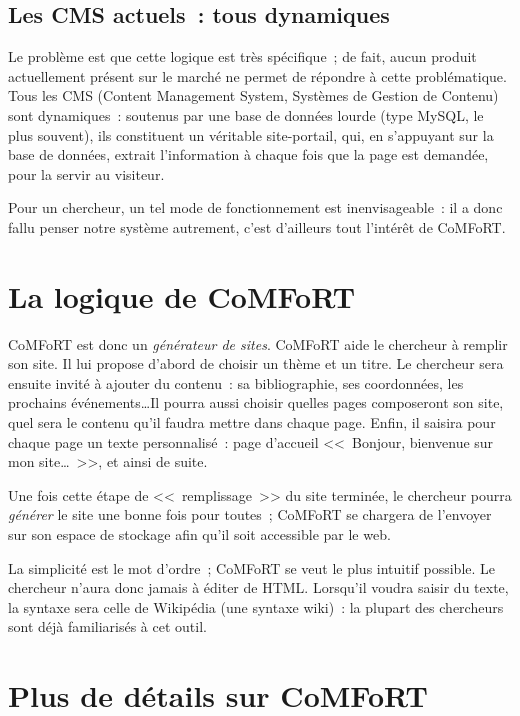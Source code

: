 \documentclass[final,11pt,a4paper,twoside,titlepage]{article}
\newcommand{\p}{\vspace{0.3em}}
\begin{document}
{    \subsection{Les CMS actuels~: tous dynamiques}
      Le problème est que cette logique est très spécifique~; de fait, aucun
      produit actuellement présent sur le marché ne permet de répondre à cette
      problématique.  Tous les CMS (Content Management System, Systèmes de
      Gestion de Contenu) sont dynamiques~: soutenus par une base de données
      lourde (type MySQL, le plus souvent), ils constituent un véritable
      site-portail, qui, en s'appuyant sur la base de données, extrait
      l'information à chaque fois que la page est demandée, pour la servir au
      visiteur.\p

      Pour un chercheur, un tel mode de fonctionnement est inenvisageable~: il a
      donc fallu penser notre système autrement, c'est d'ailleurs tout l'intérêt
      de CoMFoRT.

  \section{La logique de CoMFoRT}
    CoMFoRT est donc un \emph{générateur de sites}. CoMFoRT aide le
    chercheur à remplir son site. Il lui propose d'abord de choisir un thème et
    un titre. Le chercheur sera ensuite invité à ajouter du contenu~: sa
    bibliographie, ses coordonnées, les prochains événements\ldots Il 
    pourra aussi choisir quelles pages composeront son site, quel
    sera le contenu qu'il faudra mettre dans chaque page. Enfin, il saisira pour
    chaque page un texte personnalisé~: page d'accueil <<~Bonjour, bienvenue sur
    mon site\ldots~>>, et ainsi de suite.\p

    Une fois cette étape de <<~remplissage~>> du site terminée, le chercheur
    pourra \emph{générer} le site une bonne fois pour toutes~; CoMFoRT se
    chargera de l'envoyer sur son espace de stockage afin qu'il soit accessible
    par le web.\p

    La simplicité est le mot d'ordre~; CoMFoRT se veut le plus intuitif
    possible. Le chercheur n'aura donc jamais à éditer de HTML. Lorsqu'il voudra
    saisir du texte, la syntaxe sera celle de Wikipédia (une syntaxe wiki)~:
    la plupart des chercheurs sont déjà familiarisés à cet outil.

  \section{Plus de détails sur CoMFoRT}
}
\end{document}

